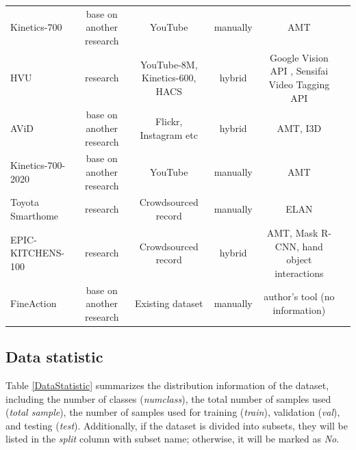 \documentclass[a4paper]{article}
\begin{document}
\begin{table}
\begin{tabular}{l|c|c|c|c|c}
		Kinetics-700            & base on another research & YouTube                         & manually      & AMT  \\
		HVU                     & research                 & YouTube-8M, Kinetics-600, HACS  & hybrid        & Google Vision API , Sensifai Video Tagging API \\
		AViD                    & base on another research & Flickr, Instagram etc           & hybrid        & AMT, I3D   \\
		Kinetics-700-2020       & base on another research & YouTube                         & manually      & AMT  \\
		Toyota Smarthome        & research                 & Crowdsourced record             & manually      & ELAN  \\
		EPIC-KITCHENS-100       & research                 & Crowdsourced record             & hybrid        & AMT, Mask R-CNN, hand object interactions\\	
		FineAction              & base on another research & Existing dataset                & manually      & author's tool (no information) \\
		\bottomrule
		
	\end{tabular}%
	\label{DataCollectionMethod}
\end{table}%

\subsection{Data statistic}

Table \ref{DataStatistic} summarizes the distribution information of the dataset, including the number of classes (\textit{numclass}), the total number of samples used (\textit{total sample}), the number of samples used for training (\textit{train}), validation (\textit{val}), and testing (\textit{test}). Additionally, if the dataset is divided into subsets, they will be listed in the \textit{split} column with subset name; otherwise, it will be marked as \textit{No}. 
\end{document}
